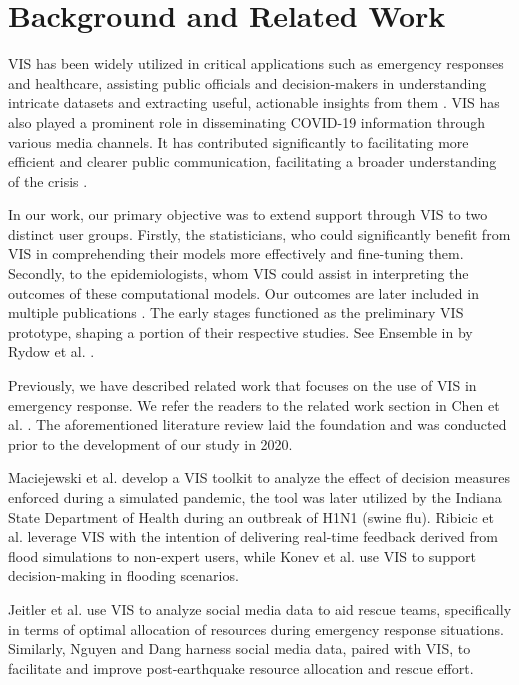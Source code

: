 \section{Background and Related Work}

\ac{VIS} has been widely utilized in critical applications such as emergency responses and healthcare, assisting public officials and decision-makers in understanding intricate datasets and extracting useful, actionable insights from them \cite{dusse2016Information}. 
\ac{VIS} has also played a prominent role in disseminating COVID-19 information through various media channels. It has contributed significantly to facilitating more efficient and clearer public communication, facilitating a broader understanding of the crisis \cite{johnshopkinsuniversityCOVID19}.

In our work, our primary objective was to extend support through \ac{VIS} to two distinct user groups.
Firstly, the statisticians, who could significantly benefit from VIS in comprehending their models more effectively and fine-tuning them.
Secondly, to the epidemiologists, whom VIS could assist in interpreting the outcomes of these computational models. Our outcomes are later included in multiple publications \cite{chen2022RAMPVIS,dykes2022Visualizationb,khan2022Propagating,khan2022Rapid,rydow2023RAMPVIS}. The early stages functioned as the preliminary VIS prototype, shaping a portion of their respective studies. See Ensemble in  by Rydow et al. \cite{rydow2023RAMPVIS}.


Previously, we have described related work that focuses on the use of \ac{VIS} in emergency response. We refer the readers to the related work section in Chen et al. \cite{chen2022RAMPVIS}. The aforementioned literature review laid the foundation and was conducted prior to the development of our study in 2020.

Maciejewski et al. \cite{maciejewski2011Pandemica} develop a VIS toolkit to analyze the effect of decision measures enforced during a simulated pandemic, the tool was later utilized by the Indiana State Department of Health during an outbreak of H1N1 (swine flu).
Ribicic et al. \cite{ribicic2012Sketching} leverage VIS with the intention of delivering real-time feedback derived from flood simulations to non-expert users, while Konev et al. \cite{konev2014Run} use VIS to support decision-making in flooding scenarios.

Jeitler et al. \cite{jeitler2019RescueMark} use VIS to analyze social media data to aid rescue teams, specifically in terms of optimal allocation of resources during emergency response situations.
Similarly, Nguyen and Dang \cite{nguyen2019EQSA} harness social media data, paired with VIS, to facilitate and improve post-earthquake resource allocation and rescue effort.

